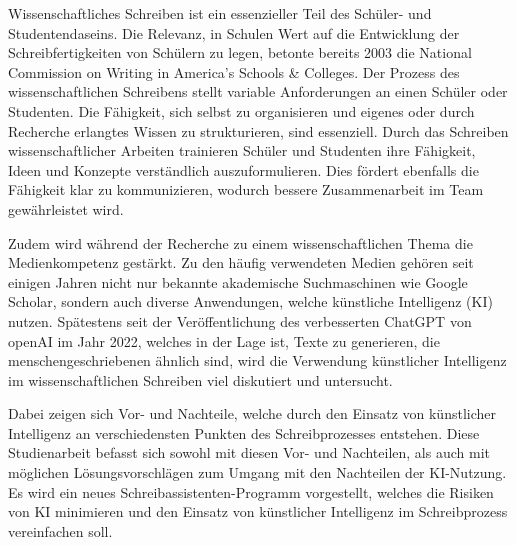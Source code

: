 \documentclass[../main.tex]{subfiles}
\begin{document}
Wissenschaftliches Schreiben ist ein essenzieller Teil des Schüler- und Studentendaseins. 
Die Relevanz, in Schulen Wert auf die Entwicklung der Schreibfertigkeiten von Schülern zu legen, betonte bereits 2003 
die National Commission on Writing in America’s Schools \& Colleges\cite{nationalcommissionwriting}.  Der Prozess des 
wissenschaftlichen Schreibens stellt variable Anforderungen an einen Schüler oder Studenten. Die Fähigkeit, sich selbst zu organisieren und 
eigenes oder durch Recherche erlangtes Wissen zu strukturieren, sind essenziell. Durch das Schreiben 
wissenschaftlicher Arbeiten trainieren Schüler und Studenten ihre Fähigkeit, Ideen und Konzepte verständlich 
auszuformulieren. Dies fördert ebenfalls die Fähigkeit klar zu kommunizieren, wodurch bessere Zusammenarbeit 
im Team gewährleistet wird.\cite{nationalcommissionwriting,teachers,humanWritingToAi}  

Zudem wird während der Recherche zu einem wissenschaftlichen Thema die Medienkompetenz gestärkt. Zu den häufig 
verwendeten Medien gehören seit einigen Jahren nicht nur bekannte akademische Suchmaschinen wie Google Scholar, sondern auch 
diverse Anwendungen, welche künstliche Intelligenz (KI) nutzen. Spätestens seit der Veröffentlichung des verbesserten ChatGPT von openAI im Jahr 2022, welches in der 
Lage ist, Texte zu generieren, die menschengeschriebenen ähnlich sind, wird die Verwendung künstlicher Intelligenz 
im wissenschaftlichen Schreiben viel diskutiert und untersucht.\cite{humanWritingToAi,ZukunftWissenschaftlichesPublizieren}

Dabei zeigen sich Vor- und Nachteile, welche durch den Einsatz von künstlicher Intelligenz an verschiedensten Punkten des Schreibprozesses entstehen. 
Diese Studienarbeit befasst sich sowohl mit diesen Vor- und Nachteilen, als auch mit möglichen
Lösungsvorschlägen zum Umgang mit den Nachteilen der KI-Nutzung. Es wird ein neues Schreibassistenten-Programm vorgestellt, welches die Risiken 
von KI minimieren und den Einsatz von künstlicher Intelligenz im Schreibprozess vereinfachen soll.
\end{document}
